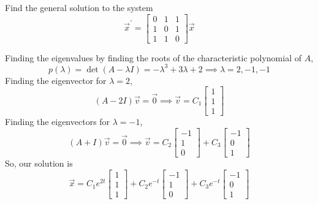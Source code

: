 \begin{example}
	Find the general solution to the system
	\begin{equation*}
		\vec{x}^\prime = \begin{bmatrix}
			0 & 1 & 1 \\
			1 & 0 & 1 \\
			1 & 1 & 0
		\end{bmatrix} \vec{x}
	\end{equation*}
\end{example}
\noindent
Finding the eigenvalues by finding the roots of the characteristic polynomial of $A$,
\begin{equation*}
	p(\lambda) = \det{(A - \lambda I)} = -\lambda^3 + 3\lambda + 2 \implies \lambda = 2, -1, -1
\end{equation*}
Finding the eigenvector for $\lambda = 2$,
\begin{equation*}
	(A - 2I)\vec{v} = \vec{0} \implies \vec{v} = C_1\begin{bmatrix}
		1 \\
		1 \\
		1
	\end{bmatrix}
\end{equation*}
Finding the eigenvectors for $\lambda = -1$,
\begin{equation*}
	(A + I)\vec{v} = \vec{0} \implies \vec{v} = C_2\begin{bmatrix}
		-1 \\
		1 \\
		0
	\end{bmatrix} + C_3\begin{bmatrix}
		-1 \\
		0 \\
		1
	\end{bmatrix}
\end{equation*}
So, our solution is
\begin{equation*}
	\vec{x} = C_1e^{2t}\begin{bmatrix}
		1 \\
		1 \\
		1
	\end{bmatrix} + C_2e^{-t}\begin{bmatrix}
		-1 \\
		1 \\
		0
	\end{bmatrix} + C_3e^{-t}\begin{bmatrix}
		-1 \\
		0 \\
		1
	\end{bmatrix}
\end{equation*}